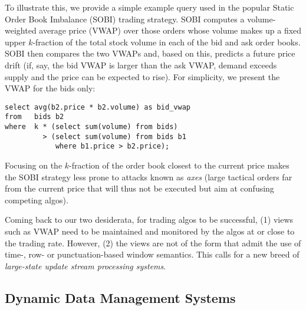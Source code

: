 To illustrate this, we provide a simple example query used in the popular Static
Order Book Imbalance (SOBI) trading strategy. SOBI computes a volume-weighted
average price (VWAP) over those orders whose volume makes up a fixed upper
$k$-fraction of the total stock volume in each of the bid and ask order books. SOBI
then compares the two VWAPs and, based on this, predicts a future price drift (if, say, the bid VWAP is larger than the ask VWAP, demand exceeds supply and the price can be expected to rise). For simplicity, we present the VWAP for the bids
only:
\begin{verbatim}
select avg(b2.price * b2.volume) as bid_vwap
from   bids b2
where  k * (select sum(volume) from bids)
         > (select sum(volume) from bids b1
            where b1.price > b2.price);
\end{verbatim}
Focusing on the $k$-fraction of the order book closest to the current price makes the SOBI strategy less prone to attacks known as {\em axes}\/ (large tactical orders far from the current price that will thus not be executed but aim at confusing competing algos).

Coming back to our two desiderata,
for trading algos to be successful, (1) views such as VWAP need to be maintained and monitored by the algos at or close to the trading rate. However, (2) the views are not of the form that admit the use of time-, row- or punctuation-based
window semantics. This calls for a new breed of {\em large-state update stream processing systems}.


\medskip



\subsection{Dynamic Data Management Systems}



